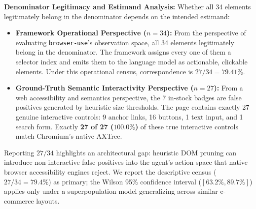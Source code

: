 \documentclass[11pt,a4paper]{article}
\begin{document}
\textbf{Denominator Legitimacy and Estimand Analysis:}
Whether all 34 elements legitimately belong in the denominator depends on the intended estimand:
\begin{itemize}
    \item \textbf{Framework Operational Perspective ($n=34$):} From the perspective of evaluating \texttt{browser-use}'s observation space, all 34 elements legitimately belong in the denominator. The framework assigns every one of them a selector index and emits them to the language model as actionable, clickable elements. Under this operational census, correspondence is $27/34 = 79.41\%$.
    \item \textbf{Ground-Truth Semantic Interactivity Perspective ($n=27$):} From a web accessibility and semantics perspective, the 7 in-stock badges are false positives generated by heuristic size thresholds. The page contains exactly 27 genuine interactive controls: 9 anchor links, 16 buttons, 1 text input, and 1 search form. Exactly \textbf{27 of 27 ($100.0\%$)} of these true interactive controls match Chromium's native AXTree.
\end{itemize}
Reporting $27/34$ highlights an architectural gap: heuristic DOM pruning can introduce non-interactive false positives into the agent's action space that native browser accessibility engines reject. We report the descriptive census ($27/34 = 79.4\%$) as primary; the Wilson 95\% confidence interval ($[63.2\%, 89.7\%]$) applies only under a superpopulation model generalizing across similar e-commerce layouts.
\end{document}
